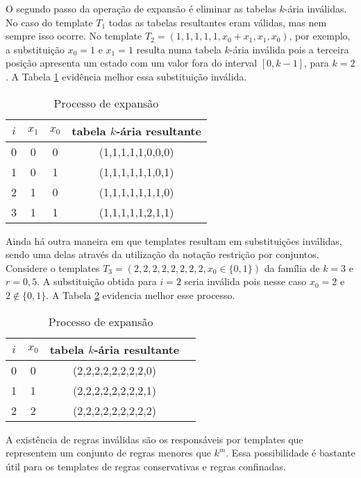 O segundo passo da operação de expansão é eliminar as tabelas $k$-ária inválidas. No caso do template $T_1$ todas as tabelas resultantes eram válidas, mas nem sempre isso ocorre. No template $T_2 = (1,1,1,1,1,x_0+x_1,x_1,x_0)$, por exemplo, a substituição $x_0 = 1$ e $x_1 = 1$ resulta numa tabela $k$-ária inválida pois a terceira posição apresenta um estado com um valor fora do interval $[0,k-1]$, para $k=2$. A Tabela \ref{tab:invalideExpansion} evidência melhor essa substituição inválida.

\begin{table}[h!]
\centering
\caption{Processo de expansão}
{
	\vspace{0.3cm}
	\begin{tabular}{cccc}
	\hline
	$i$ & $x_1$ & $x_0$ & tabela $k$-ária resultante \\
	\hline
	0	&	0	&	0	&	(1,1,1,1,1,0,0,0)	\\
	1	&	0	&	1	&	(1,1,1,1,1,1,0,1)	\\
	2	&	1	&	0	&	(1,1,1,1,1,1,1,0)	\\
	3	&	1	&	1	&	(1,1,1,1,1,2,1,1)	\\
	\hline
	\end{tabular}
}
\label{tab:invalideExpansion}
\end{table}

Ainda há outra maneira em que templates resultam em substituições inválidas, sendo uma delas através da utilização da notação restrição por conjuntos. Considere o templates $T_3 = (2,2,2,2,2,2,2,2,x_0\in \{0,1\})$ da família de $k=3$ e $r=0{,}5$. %
A substituição obtida para $i = 2$ seria inválida pois nesse caso $x_0 = 2$ e $2 \notin \{0,1\}$. A Tabela \ref{tab:invalideExpansion2} evidencia melhor esse processo.

\begin{table}[h!]
\centering
\caption{Processo de expansão}
{
	\vspace{0.3cm}
	\begin{tabular}{cccc}
	\hline
	$i$ & $x_0$ & tabela $k$-ária resultante \\
	\hline
	0	&	0	&	(2,2,2,2,2,2,2,2,0)	\\
	1	&	1	&	(2,2,2,2,2,2,2,2,1)	\\
	2	&	2	&	(2,2,2,2,2,2,2,2,2)	\\
	\hline
	\end{tabular}
}
\label{tab:invalideExpansion2}
\end{table}

A existência de regras inválidas são os responsáveis por templates que representem um conjunto de regras menores que $k^m$. Essa possibilidade é bastante útil para os templates de regras conservativas e regras confinadas.

